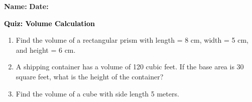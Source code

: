 \documentclass[12pt, letterpaper, fleqn]{article}
\begin{document}
\textbf{Name:} \underline{\hspace{5cm}}
\hfill
\textbf{Date:} \underline{\hspace{3cm}}\\

\begin{tcolorbox}[colback=customteal!20]
    \large\textcolor{black}{\textbf{Quiz: Volume Calculation}}
\end{tcolorbox}
\begin{enumerate}[itemsep=3.5cm, leftmargin=0.6cm]
\item Find the volume of a rectangular prism with length = 8 cm, width = 5 cm, and height = 6 cm.
\vspace{3.5cm}
\item A shipping container has a volume of 120 cubic feet. If the base area is 30 square feet, what is the height of the container?
\vspace{3.5cm}
\item Find the volume of a cube with side length 5 meters.
\end{enumerate}
\end{document}
